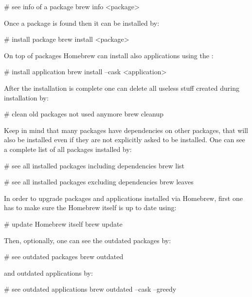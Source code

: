 \begin{bash}
# see info of a package
brew info <package>
\end{bash}

Once a package is found then it can be installed by:

\begin{bash}
# install package
brew install <package>
\end{bash}

On top of packages Homebrew can install also applications using the :

\begin{bash}
# install application
brew install --cask <application>
\end{bash}

After the installation is complete one can delete all useless stuff created during installation by:

\begin{bash}
# clean old packages not used anymore
brew cleanup
\end{bash}

Keep in mind that many packages have dependencies on other packages, that will also be installed even if they are not
explicitly asked to be installed. One can see a complete list of all packages installed by:

\begin{bash}
# see all installed packages including dependencies
brew list
\end{bash}

\begin{bash}
# see all installed packages excluding dependencies
brew leaves
\end{bash}

In order to upgrade packages and applications installed via Homebrew, first one has to make sure the Homebrew itself
is up to date using:

\begin{bash}
# update Homebrew itself
brew update
\end{bash}

Then, optionally, one can see the outdated packages by:

\begin{bash}
# see outdated packages
brew outdated
\end{bash}

and outdated applications by:

\begin{bash}
# see outdated applications
brew outdated --cask --greedy
\end{bash}

